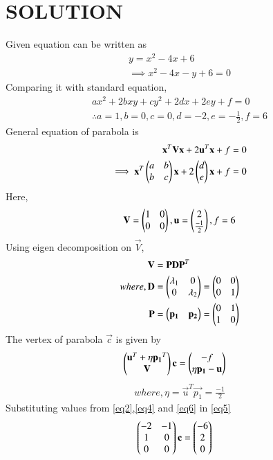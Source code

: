 \documentclass[journal,12pt,twocolumn]{IEEEtran}
\begin{document}
\section{SOLUTION} 
Given equation can be written as
\begin{align}
y = x^2-4x+6      \label{eq1}
\\
\implies x^2-4x-y+6 =0
\end{align}
Comparing it with standard equation,
\begin{align}
a x^2+2b x y+c y^2+2d x+2e y+f=0
\\
\therefore a=1,b=0,c=0,d=-2,e=-\frac{1}{2},f=6
\end{align}
General equation of parabola is 
\begin{align}
\mathbf{x}^T \mathbf{V}\mathbf{x}+ 2\mathbf{u}^T\mathbf{x}+f&=0
\\
\implies\mathbf{x}^T\begin{pmatrix}a&b\\b&c\end{pmatrix}\mathbf{x}+ 2\begin{pmatrix}d\\e\end{pmatrix}\mathbf{x}+f&=0
\end{align}
Here,
\begin{align}
\mathbf{V}=\begin{pmatrix}1 & 0 \\ 0 & 0\end{pmatrix},\mathbf{u}=\begin{pmatrix}2 \\ \frac{-1}{2}\end{pmatrix},f=6  \label{eq2}
\end{align}
Using eigen decomposition on $\vec{V}$,
\begin{align}
\mathbf{V}&=\mathbf{P}\mathbf{D}\mathbf{P}^T
\\
where,\mathbf{D}&=\begin{pmatrix}\lambda_1 & 0 \\ 0 & \lambda_2\end{pmatrix} = \begin{pmatrix}0 & 0\\0 & 1\end{pmatrix}   \label{eq3}
\\
\mathbf{P}&=\begin{pmatrix}\mathbf{p_1} & \mathbf{p_2}\end{pmatrix} =\begin{pmatrix}0 & 1\\1 & 0\end{pmatrix}  \label{eq4}
\end{align}
The vertex of parabola $\vec{c}$ is given by
\begin{align}
\begin{pmatrix}\mathbf{u}^T + \eta\mathbf{p_1}^T \\ \mathbf{V}\end{pmatrix}\mathbf{c} &= \begin{pmatrix}-f \\ \eta\mathbf{p_1}-\mathbf{u}\end{pmatrix} \label{eq5}
\end{align}
\begin{align}
where,\eta=\vec{u}^T\vec{p_1}=\frac{-1}{2}  \label{eq6}
\end{align}
Substituting values from \eqref{eq2},\eqref{eq4} and \eqref{eq6} in \eqref{eq5}
\begin{align}
\begin{pmatrix}-2 & -1 \\ 1 & 0 \\ 0 & 0\end{pmatrix}\mathbf{c} &= \begin{pmatrix}-6 \\ 2 \\ 0\end{pmatrix} \label{eq7}
\end{align}
\end{document}
